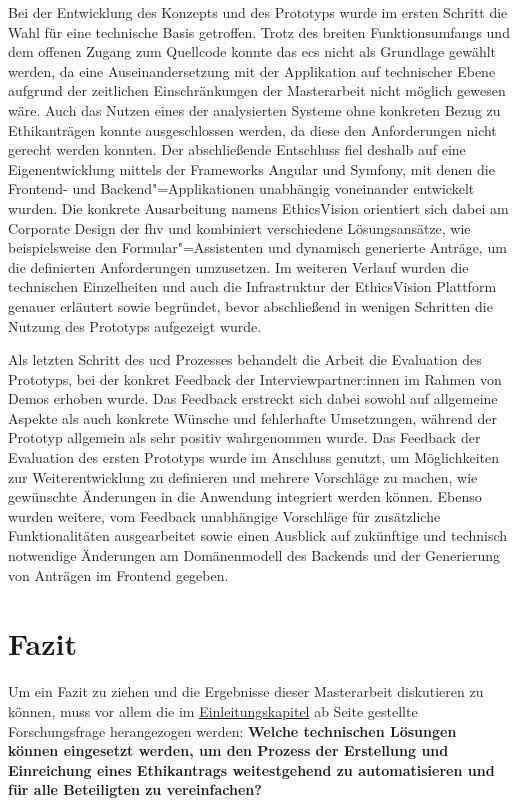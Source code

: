 \documentclass[a4paper,12pt,twoside,numbers=noendperiod]{scrreprt}
\begin{document}
Bei der Entwicklung des Konzepts und des Prototyps wurde im ersten Schritt die Wahl für eine technische Basis getroffen. Trotz des breiten Funktionsumfangs und dem offenen Zugang zum Quellcode konnte das \ac{ecs} nicht als Grundlage gewählt werden, da eine Auseinandersetzung mit der Applikation auf technischer Ebene aufgrund der zeitlichen Einschränkungen der Masterarbeit nicht möglich gewesen wäre. Auch das Nutzen eines der analysierten Systeme ohne konkreten Bezug zu Ethikanträgen konnte ausgeschlossen werden, da diese den Anforderungen nicht gerecht werden konnten. Der abschließende Entschluss fiel deshalb auf eine Eigenentwicklung mittels der Frameworks Angular und Symfony, mit denen die Frontend- und Backend"=Applikationen unabhängig voneinander entwickelt wurden. Die konkrete Ausarbeitung namens EthicsVision orientiert sich dabei am Corporate Design der \ac{fhv} und kombiniert verschiedene Lösungsansätze, wie beispielsweise den Formular"=Assistenten und dynamisch generierte Anträge, um die definierten Anforderungen umzusetzen. Im weiteren Verlauf wurden die technischen Einzelheiten und auch die Infrastruktur der EthicsVision Plattform genauer erläutert sowie begründet, bevor abschließend in wenigen Schritten die Nutzung des Prototyps aufgezeigt wurde.

\medskip

Als letzten Schritt des \ac{ucd} Prozesses behandelt die Arbeit die Evaluation des Prototyps, bei der konkret Feedback der Interviewpartner:innen im Rahmen von Demos erhoben wurde. Das Feedback erstreckt sich dabei sowohl auf allgemeine Aspekte als auch konkrete Wünsche und fehlerhafte Umsetzungen, während der Prototyp allgemein als sehr positiv wahrgenommen wurde. Das Feedback der Evaluation des ersten Prototyps wurde im Anschluss genutzt, um Möglichkeiten zur Weiterentwicklung zu definieren und mehrere Vorschläge zu machen, wie gewünschte Änderungen in die Anwendung integriert werden können. Ebenso wurden weitere, vom Feedback unabhängige Vorschläge für zusätzliche Funktionalitäten ausgearbeitet sowie einen Ausblick auf zukünftige und technisch notwendige Änderungen am Domänenmodell des Backends und der Generierung von Anträgen im Frontend gegeben.

\section{Fazit}
\label{sec:fazit}

Um ein Fazit zu ziehen und die Ergebnisse dieser Masterarbeit diskutieren zu können, muss vor allem die im \hyperref[chap:einleitung]{Einleitungskapitel} ab Seite \pageref{chap:einleitung} gestellte Forschungsfrage herangezogen werden:\newline
\textbf{Welche technischen Lösungen können eingesetzt werden, um den Prozess der Erstellung und Einreichung eines Ethikantrags weitestgehend zu automatisieren und für alle Beteiligten zu vereinfachen?}
\end{document}
